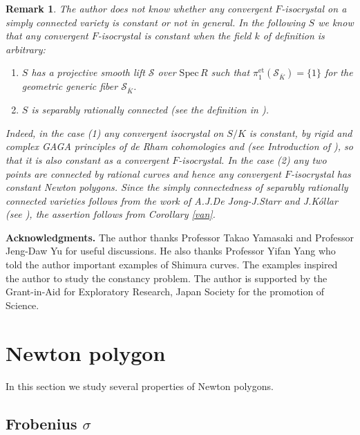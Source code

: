 \documentclass[11pt]{amsart}
\newtheorem{remark}[Lemma]{Remark}
\begin{document}
\begin{remark} The author does not know whether 
any convergent $F$-isocrystal on a simply connected variety is constant 
or not in general. 
In the following $S$ we know that any convergent $F$-isocrystal is constant when 
the field $k$ of definition is arbitrary: 
\begin{enumerate}
\item $S$ has a projective smooth lift $\mathcal S$ over $\mathrm{Spec}\, R$ 
such that $\pi_1^{\mathrm{et}}(\mathcal S_{\overline{K}}) = \{1 \}$ 
for the geometric generic fiber $\mathcal S_{\overline{K}}$. 
\item $S$ is separably rationally connected (see the definition in \cite[IV, Definition 3.2]{Ko}). 
\end{enumerate}
Indeed, 
in the case (1) any convergent isocrystal on $S/K$ is constant, 
by rigid and complex GAGA principles of de Rham cohomologies 
and \cite{Ma} \cite{Gr} (see Introduction of \cite{Shi}), 
so that it is also constant as a convergent $F$-isocrystal. 
In the case (2) any two points are connected by rational curves \cite[IV,Theorem 3.9]{Ko} and hence 
any convergent $F$-isocrystal has constant Newton polygons. Since the simply connectedness of 
separably rationally connected varieties 
follows from the work of A.J.De Jong-J.Starr \cite{DS} and J.K\'ollar (see \cite[Corollary 3.6]{De}), the assertion follows from 
Corollary \ref{van}. 
\end{remark}

\vspace*{3mm}

\noindent
{\bf Acknowledgments.} The author thanks Professor Takao Yamasaki and Professor Jeng-Daw Yu 
for useful discussions. He also thanks Professor Yifan Yang who told the author 
important examples of Shimura curves. 
The examples inspired the author to study the constancy problem. 
The author is supported by the Grant-in-Aid for Exploratory Research, 
Japan Society for the promotion of Science.

\section{Newton polygon}

In this section we study several properties of Newton polygons. 

\subsection{Frobenius $\sigma$}
\end{document}
